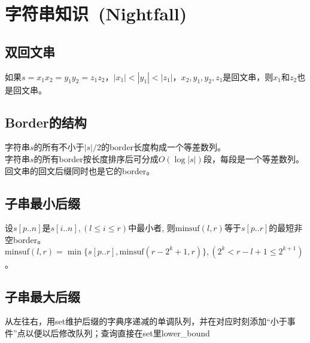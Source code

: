 \section{字符串知识\ \small(Nightfall)}
	\subsection*{双回文串}
		如果$ s = x_1 x_2 = y_1 y_2 = z_1 z_2 $，$ \left|x_1\right| < \left|y_1\right| < \left|z_1\right| $，$ x_2, y_1, y_2, z_1 $是回文串，则$ x_1 $和$ z_2 $也是回文串。
	\subsection*{Border的结构}
		字符串$ s $的所有不小于$ \left|s\right| / 2 $的border长度构成一个等差数列。
		\\字符串$ s $的所有border按长度排序后可分成$ O(\log \left| s \right|) $段，每段是一个等差数列。
		\\回文串的回文后缀同时也是它的border。
	\subsection*{子串最小后缀}
		设$ s[p..n] $是$ s[i..n], (l \leq i \leq r) $中最小者, 则$ \text{minsuf}(l, r) $等于$ s[p..r] $的最短非空border。$ \text{minsuf}(l, r) = \min \lbrace s[p..r], \text{minsuf}(r - 2^k + 1, r) \rbrace, (2^k < r - l + 1 \leq 2^{k + 1} ) $。
	\subsection*{子串最大后缀}
		从左往右，用set维护后缀的字典序递减的单调队列，并在对应时刻添加“小于事件”点以便以后修改队列；查询直接在set里lower\_bound
